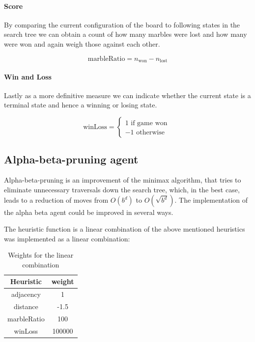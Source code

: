 \documentclass{llncs}
\begin{document}
\paragraph{Score}
By comparing the current configuration of the board to following states in the search tree we can obtain a count of how many marbles were lost and how many were won and again weigh those against each other.

$$ \text{marbleRatio} = n_{\text{won}} - n_{\text{lost}} $$

\paragraph{Win and Loss}
Lastly as a more definitive measure we can indicate whether the current state is a terminal state and hence a winning or losing state.

$$ \text{winLoss} =
  \begin{cases}
    1 \text{ if game won } \\
    -1 \text{ otherwise}
  \end{cases}
$$

\subsection{Alpha-beta-pruning agent}
Alpha-beta-pruning is an improvement of the minimax algorithm, that tries to eliminate unnecessary traversals down the search tree, which, in the best case, leads to a reduction of moves from $ O(b^d) $ to $ O(\sqrt{b^d}) $. The implementation of the alpha beta agent could be improved in several ways.

The heuristic function is a linear combination of the above mentioned heuristics was implemented as a linear combination:

\begin{table}
  \begin{center}
    \begin{tabular}{ | c | c | }
      \hline
      Heuristic   & weight \\
      \hline
      adjacency   & 1      \\
      \hline
      distance    & -1.5   \\
      \hline
      marbleRatio & 100    \\
      \hline
      winLoss     & 100000 \\
      \hline
    \end{tabular}
  \end{center}
  \caption{Weights for the linear combination}
  \label{heuristic_table}
\end{table}
\end{document}
